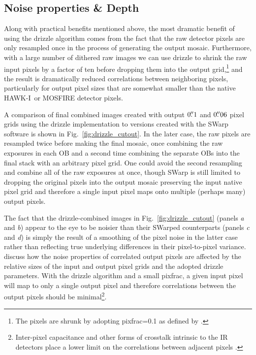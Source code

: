 \documentclass[preprint2]{aastex6}
\gdef\HAWKI{\mbox{HAWK-I}}
\begin{document}
\subsection{Noise properties \& Depth}
\label{s:depth}

Along with practical benefits mentioned above, the most dramatic benefit of using the drizzle algorithm comes from the fact that the raw detector pixels are only resampled once in the process of generating the output mosaic.  Furthermore, with a large number of dithered raw images we can use drizzle to shrink the raw input pixels by a factor of ten before dropping them into the output grid,\footnote{The pixels are shrunk by adopting pixfrac=0.1 as defined by \cite{fruchter:02}.} and the result is dramatically reduced correlations between neighboring pixels, particularly for output pixel sizes that are somewhat smaller than the native \HAWKI\ or MOSFIRE detector pixels.

A comparison of final combined images created with output $0\mbox{$.\!\!^{\prime\prime}$}1$ and $0\mbox{$.\!\!^{\prime\prime}$}06$ pixel grids using the drizzle implementation to versions created with the SWarp software \citep{swarp} is shown in Fig.~\ref{fig:drizzle_cutout}.  In the later case, the raw pixels are resampled twice before making the final mosaic, once combining the raw exposures in each OB and a second time combining the separate OBs into the final stack with an arbitrary pixel grid.  One could avoid the second resampling and combine all of the raw exposures at once, though SWarp is still limited to dropping the original pixels into the output mosaic preserving the input native pixel grid and therefore a single input pixel maps onto multiple (perhaps many) output pixels.

The fact that the drizzle-combined images in Fig.~\ref{fig:drizzle_cutout} (panels \textit{a} and \textit{b}) appear to the eye to be noisier than their SWarped counterparts (panels \textit{c} and \textit{d}) is simply the result of a smoothing of the pixel noise in the latter case rather than reflecting true underlying differences in their pixel-to-pixel variance.  \cite{casertano:00} discuss how the noise properties of correlated output pixels are affected by the relative sizes of the input and output pixel grids and the adopted drizzle parameters.  With the drizzle algorithm and a small pixfrac, a given input pixel will map to only a single output pixel and therefore correlations between the output pixels should be minimal\footnote{Inter-pixel capacitance and other forms of crosstalk intrinsic to the IR detectors place a lower limit on the correlations between adjacent pixels \citep{finger:05, hilbert:ipc}.}.  
\end{document}
